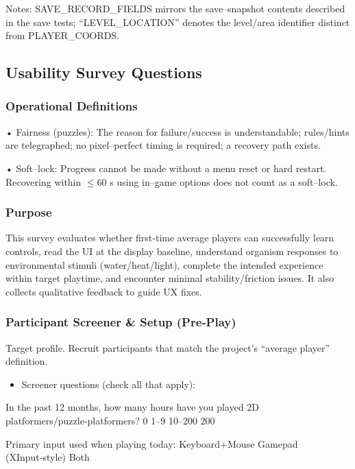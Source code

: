 \documentclass[12pt, titlepage]{article}
\begin{document}
Notes: SAVE\_RECORD\_FIELDS mirrors the save--snapshot contents described in the save tests; “LEVEL\_LOCATION” denotes the level/area identifier distinct from PLAYER\_COORDS.

\subsection{Usability Survey Questions}

\subsubsection{Operational Definitions}

• Fairness (puzzles): The reason for failure/success is understandable; rules/hints are telegraphed; no pixel--perfect timing is required; a recovery path exists.

• Soft--lock: Progress cannot be made without a menu reset or hard restart. Recovering within $\leq$60 s using in--game options does not count as a soft--lock.

\subsubsection{Purpose}

This survey evaluates whether first‑time average players can successfully learn controls, read the UI at the display baseline, understand organism responses to environmental stimuli (water/heat/light), complete the intended experience within target playtime, and encounter minimal stability/friction issues. It also collects qualitative feedback to guide UX fixes.

\subsubsection{Participant Screener & Setup (Pre‑Play)}

Target profile. Recruit participants that match the project’s “average player” definition.

\begin{itemize}
  \item Screener questions (check all that apply):
\end{itemize}

In the past 12 months, how many hours have you played 2D platformers/puzzle‑platformers?
  0  1–9  10–200  200

Primary input used when playing today:  Keyboard+Mouse  Gamepad (XInput‑style)  Both
\end{document}
